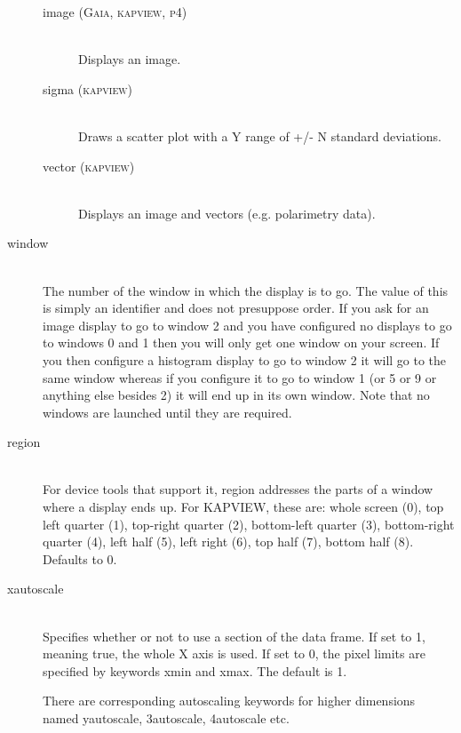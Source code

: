 \documentclass[twoside,11pt]{article}
\newcommand{\xref}[3]{#1}
\renewcommand{\_}{\texttt{\symbol{95}}}
\newcommand{\kapview}{\textsc{kapview}}
\newcommand{\gaia}{\xref{{\textsc{Gaia}}}{sun214}{}}
\begin{document}
\begin{description}
\begin{description}
\item[image (\gaia, \kapview, \textsc{p4})]
\hfil\\
Displays an image.

\item[sigma (\kapview)]
\hfil\\
Draws a scatter plot with a Y range of +/- N standard deviations.

\item[vector (\kapview)]
\hfil\\
Displays an image and vectors (e.g. polarimetry data).

\end{description}

\item[window]
\hfil\\
The number of the window in which the display is to go. The value of
this is simply an identifier and does not presuppose order. If you ask 
for an image display to go to window 2 and you have configured no
displays to go to windows 0 and 1 then you will only get one window on 
your screen. If you then configure a histogram display to go to window 
2 it will go to the same window whereas if you configure it to go to
window 1 (or 5 or 9 or anything else besides 2) it will end up in its
own window. Note that no windows are launched until they are
required.

\item[region]
\hfil\\
For device tools that support it, region addresses the parts of a
window where a display ends up. For KAPVIEW, these are: whole screen
(0), top left quarter (1), top-right quarter (2), bottom-left quarter
(3), bottom-right quarter (4), left half (5), left right (6), top half 
(7), bottom half (8).  Defaults to 0.

\item[xautoscale]
\hfil\\
Specifies whether or not to use a section of the data frame.  If set to
1, meaning true, the whole X axis is used.  If set to 0, the pixel limits
are specified by keywords xmin and xmax.  The default is 1.

There are corresponding autoscaling keywords for higher dimensions
named yautoscale, 3autoscale, 4autoscale etc.


\end{description}
\end{document}
